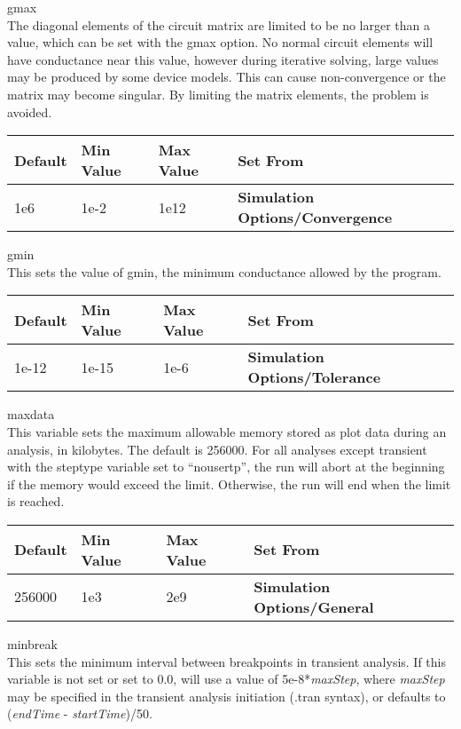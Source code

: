 \begin{description}
\item{\et gmax}\\
The diagonal elements of the circuit matrix are limited to be no
larger than a value, which can be set with the {\et gmax} option.  No
normal circuit elements will have conductance near this value, however
during iterative solving, large values may be produced by some device
models.  This can cause non-convergence or the matrix may become
singular.  By limiting the matrix elements, the problem is avoided.

\begin{tabular}{|l|l|l|l|}\hline
\bf Default & \bf Min Value & \bf Max Value & \bf Set From\\ \hline
1e6 & 1e-2 & 1e12 & \bf Simulation Options/Convergence\\ \hline
\end{tabular}

\item{\et gmin}\\
This sets the value of {\vt gmin}, the minimum conductance allowed by the
program.

\begin{tabular}{|l|l|l|l|}\hline
\bf Default & \bf Min Value & \bf Max Value & \bf Set From\\ \hline
1e-12 & 1e-15 & 1e-6 & \bf Simulation Options/Tolerance\\ \hline
\end{tabular}

\item{\et maxdata}\\
This variable sets the maximum allowable memory stored as plot data
during an analysis, in kilobytes.  The default is 256000.  For all
analyses except transient with the {\et steptype} variable set to
``{\vt nousertp}'', the run will abort at the beginning if the memory
would exceed the limit.  Otherwise, the run will end when the limit is
reached.

\begin{tabular}{|l|l|l|l|}\hline
\bf Default & \bf Min Value & \bf Max Value & \bf Set From\\ \hline
256000 & 1e3 & 2e9 & \bf Simulation Options/General\\ \hline
\end{tabular}

\item{\et minbreak}\\
This sets the minimum interval between breakpoints in transient
analysis.  If this variable is not set or set to 0.0, {\WRspice} will
use a value of 5e-8*{\it maxStep}, where {\it maxStep} may be
specified in the transient analysis initiation ({\vt .tran} syntax),
or defaults to ({\it endTime} - {\it startTime\/})/50.


\end{description}
